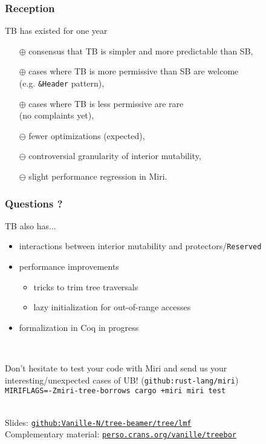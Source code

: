 \begin{frame}
    \frametitle{Reception}
    TB has existed for one year
    \begin{itemize}
        \item[$\oplus$] consensus that TB is simpler and more predictable than SB,
        \item[$\oplus$] cases where TB is more permissive than SB are welcome \\ (e.g. \texttt{\&Header} pattern),
        \item[$\oplus$] cases where TB is less permissive are rare \\ (no complaints yet),
        \item[$\ominus$] fewer optimizations (expected),
        \item[$\ominus$] controversial granularity of interior mutability,
        \item[$\ominus$] slight performance regression in Miri.
    \end{itemize}
\end{frame}

\begin{frame}
    \frametitle{Questions ?}

    TB also has...
    \begin{itemize}
        \item interactions between interior mutability and protectors/\texttt{Reserved}
        \item performance improvements
            \begin{itemize}
                \item tricks to trim tree traversals
                \item lazy initialization for out-of-range accesses
            \end{itemize}
        \item formalization in Coq in progress
    \end{itemize}~\\
    \vfill

    Don't hesitate to test your code with Miri and send us your
    interesting/unexpected cases of UB!
    (\texttt{github:rust-lang/miri}) \\
    {\color{blue} \texttt{MIRIFLAGS=-Zmiri-tree-borrows cargo +miri miri test}}\\~\\
    \vfill

    Slides: \href{https://github.com/Vanille-N/tree-beamer/tree/lmf}{\texttt{github:Vanille-N/tree-beamer/tree/lmf}}\\
    Complementary material: \href{https://perso.crans.org/vanille/treebor}{\texttt{perso.crans.org/vanille/treebor}}\\
\end{frame}
